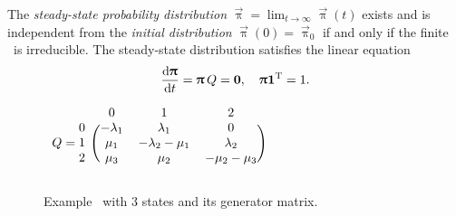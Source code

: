 The \emph{steady-state probability distribution}
$\vec{\uppi} = \lim_{t \to \infty} \vec{\uppi}(t)$ exists and is
independent from the \emph{initial distribution}
$\vec{\uppi}(0) = \vec{\uppi}_0$ if and only if the finite \CTMC\ is
irreducible. The steady-state distribution satisfies the linear
equation
\begin{equation}
  \label{eq:background:ctmc:steadystate}
  \frac{\mathrm{d} \bm{\mathrm{\uppi}}}{\mathrm{d} t} = \bm{\mathrm{\uppi}} \, Q = \bm{\mathrm{0}},
  \quad \bm{\mathrm{\uppi}} \bm{\mathrm{1}}^{\mathrm{T}} = 1 \text.
\end{equation}

\begin{figure}
  \begin{minipage}{.49\linewidth}
    \centering
  \end{minipage}
  \begin{minipage}{.49\linewidth}
    \centering
    $\begin{blockarray}{rccc}
      & 0 & 1 & 2 \\
      \begin{block}{r(ccc)}
        0 & -\lambda_1 & \lambda_1 & 0 \\
        Q = 1 & \mu_1 & -\lambda_2 - \mu_1 & \lambda_2 \\
        2 & \mu_3 & \mu_2 & -\mu_2 - \mu_3 \\
      \end{block}
    \end{blockarray}$
    \vspace{0.5cm}
  \end{minipage}
  \caption{Example \CTMC\ with 3 states and its generator matrix.}
  \label{fig:background:ctmc:repair}
\end{figure}

